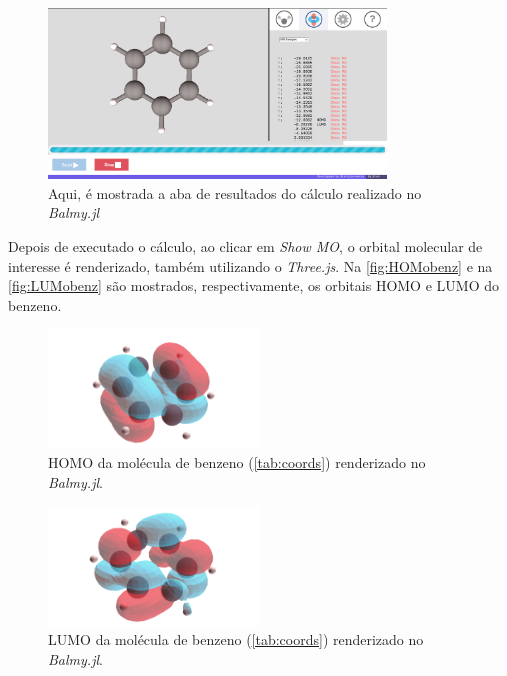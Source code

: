 \begin{figure}[htb]
	\caption{\label{fig:results} Aqui, é mostrada a aba de resultados do cálculo realizado no \textit{Balmy.jl}}
	\begin{center}
		\includegraphics[width=0.8\textwidth]{images/results.png}
	\end{center}
\end{figure}

Depois de executado o cálculo, ao clicar em \textit{Show MO}, o orbital molecular de interesse é renderizado, também utilizando o \textit{Three.js}. Na \autoref{fig:HOMobenz} e na \autoref{fig:LUMobenz} são mostrados, respectivamente, os orbitais \gls{HOMO} e \gls{LUMO} do benzeno.

\begin{figure}[htb]
\caption{\label{fig:HOMobenz} \gls{HOMO} da molécula de benzeno (\autoref{tab:coords}) renderizado no \textit{Balmy.jl}.}
	\begin{center}
		\includegraphics[width=0.5\textwidth]{images/30.png}
	\end{center}
\end{figure}

\begin{figure}[htb]
\caption{\label{fig:LUMobenz} \gls{LUMO} da molécula de benzeno (\autoref{tab:coords}) renderizado no \textit{Balmy.jl}.}
	\begin{center}
		\includegraphics[width=0.5\textwidth]{images/31.png}
	\end{center}
\end{figure}

